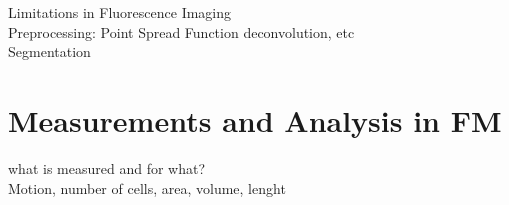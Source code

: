 Limitations in Fluorescence Imaging\\
Preprocessing: Point Spread Function deconvolution, etc\\
Segmentation 


\section{Measurements and Analysis in FM}
\label{sec:Measurements}

what is measured and for what?\\
Motion, number of cells, area, volume, lenght